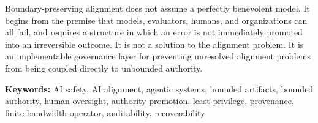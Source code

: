 Boundary-preserving alignment does not assume a perfectly benevolent model. It begins from the premise that models, evaluators, humans, and organizations can all fail, and requires a structure in which an error is not immediately promoted into an irreversible outcome. It is not a solution to the alignment problem. It is an implementable governance layer for preventing unresolved alignment problems from being coupled directly to unbounded authority.

\textbf{Keywords:} AI safety, AI alignment, agentic systems, bounded artifacts, bounded authority, human oversight, authority promotion, least privilege, provenance, finite-bandwidth operator, auditability, recoverability
